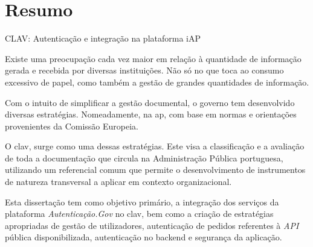 \chapter*{Resumo}

\large{CLAV: Autenticação e integração na plataforma iAP}
\vspace{5mm}

Existe uma preocupação cada vez maior em relação à quantidade de informação gerada e recebida por diversas instituições. Não só no que toca ao consumo excessivo de papel, como também a gestão de grandes quantidades de informação.

Com o intuito de simplificar a gestão documental, o governo tem desenvolvido diversas estratégias. Nomeadamente, na \gls{ap}, com base em normas e orientações provenientes da Comissão Europeia.

O \gls{clav}, surge como uma dessas estratégias. Este visa a classificação e a avaliação de toda a documentação que circula na Administração Pública portuguesa, utilizando um referencial comum que permite o desenvolvimento de instrumentos de natureza transversal a aplicar em contexto organizacional.

Esta dissertação tem como objetivo primário, a integração dos serviços da plataforma \emph{Autenticação.Gov} no \gls{clav}, bem como a criação de estratégias apropriadas de gestão de utilizadores, autenticação de pedidos referentes à \emph{API} pública disponibilizada, autenticação no backend e segurança da aplicação.

\vspace{5cm}
